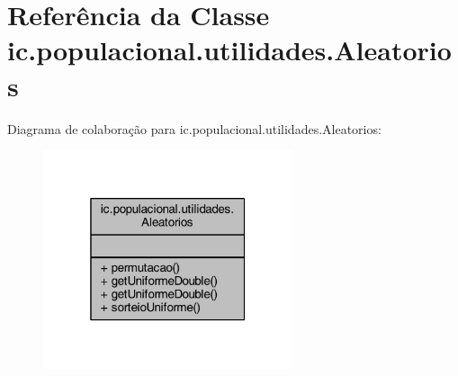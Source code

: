 \hypertarget{classic_1_1populacional_1_1utilidades_1_1_aleatorios}{\section{Referência da Classe ic.\-populacional.\-utilidades.\-Aleatorios}
\label{classic_1_1populacional_1_1utilidades_1_1_aleatorios}
}


Diagrama de colaboração para ic.\-populacional.\-utilidades.\-Aleatorios\-:\nopagebreak
\begin{figure}[H]
\begin{center}
\leavevmode
\includegraphics[width=208pt]{classic_1_1populacional_1_1utilidades_1_1_aleatorios__coll__graph}
\end{center}
\end{figure}
